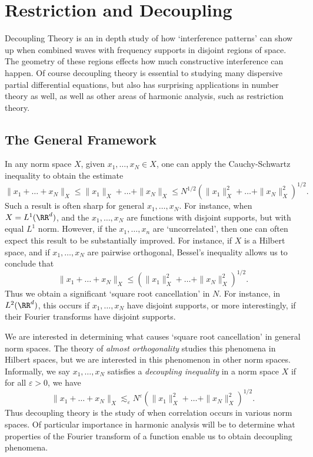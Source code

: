 
\part{Restriction and Decoupling}

Decoupling Theory is an in depth study of how `interference patterns' can show up when combined waves with frequency supports in disjoint regions of space. The geometry of these regions effects how much constructive interference can happen. Of course decoupling theory is essential to studying many dispersive partial differential equations, but also has surprising applications in number theory as well, as well as other areas of harmonic analysis, such as restriction theory.

\chapter{The General Framework}

In any norm space $X$, given $x_1, \dots, x_N \in X$, one can apply the Cauchy-Schwartz inequality to obtain the estimate
%
\[ \| x_1 + \dots + x_N \|_X \leq \| x_1 \|_X + \dots + \| x_N \|_X \leq N^{1/2} \left( \| x_1 \|_X^2 + \dots + \| x_N \|_X^2 \right)^{1/2}. \]
%
Such a result is often sharp for general $x_1, \dots, x_N$. For instance, when $X = L^1(\RR^d)$, and the $x_1, \dots, x_N$ are functions with disjoint supports, but with equal $L^1$ norm. However, if the $x_1, \dots, x_n$ are `uncorrelated', then one can often expect this result to be substantially improved. For instance, if $X$ is a Hilbert space, and if $x_1, \dots, x_N$ are pairwise orthogonal, Bessel's inequality allows us to conclude that
%
\[ \| x_1 + \dots + x_N \|_X \leq \left( \| x_1 \|_X^2 + \dots + \| x_N \|_X^2 \right)^{1/2}. \]
%
Thus we obtain a significant `square root cancellation' in $N$. For instance, in $L^2(\RR^d)$, this occurs if $x_1, \dots, x_N$ have disjoint supports, or more interestingly, if their Fourier transforms have disjoint supports.

We are interested in determining what causes `square root cancellation' in general norm spaces. The theory of \emph{almost orthogonality} studies this phenomena in Hilbert spaces, but we are interested in this phenomenon in other norm spaces. Informally, we say $x_1, \dots, x_N$ satisfies a \emph{decoupling inequality} in a norm space $X$ if for all $\varepsilon > 0$, we have
%
\[ \| x_1 + \dots + x_N \|_X \lesssim_\varepsilon N^\varepsilon \left( \| x_1 \|_X^2 + \dots + \| x_N \|_X^2 \right)^{1/2}. \]
%
Thus decoupling theory is the study of when correlation occurs in various norm spaces. Of particular importance in harmonic analysis will be to determine what properties of the Fourier transform of a function enable us to obtain decoupling phenomena.

